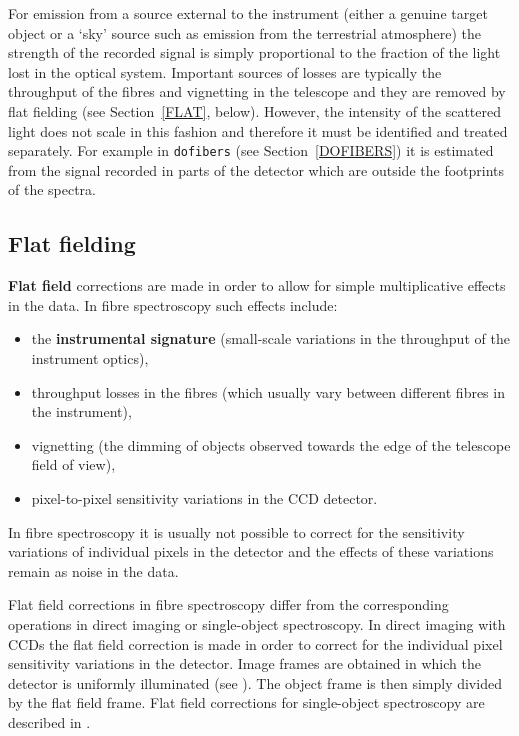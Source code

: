\documentclass[twoside,11pt]{starlink}
\begin{document}
For emission from a source external to the instrument (either a
genuine target object or a `sky' source such as emission from the
terrestrial atmosphere) the strength of the recorded signal is simply
proportional to the fraction of the light lost in the optical system.
Important sources of losses are typically the throughput of the fibres
and vignetting in the telescope and they are removed by flat fielding
(see Section~\ref{FLAT}, below).  However, the intensity of the scattered
light does not scale in this fashion and therefore it must be identified
and treated separately.  For example in \texttt{dofibers} (see
Section~\ref{DOFIBERS}) it is estimated from the signal recorded in parts
of the detector which are outside the footprints of the spectra.

\subsection{\label{FLAT}Flat fielding}

\textbf{Flat field} corrections are made in order to allow for simple
multiplicative effects in the data.  In fibre spectroscopy such effects
include:

\begin{itemize}

  \item the \textbf{instrumental signature} (small-scale variations in the
   throughput of the instrument optics),

  \item throughput losses in the fibres (which usually vary between
   different fibres in the instrument),

  \item vignetting (the dimming of objects observed towards the edge of
   the telescope field of view),

  \item pixel-to-pixel sensitivity variations in the CCD detector.

\end{itemize}

In fibre spectroscopy it is usually not possible to correct for the
sensitivity variations of individual pixels in the detector and the
effects of these variations remain as noise in the data.

Flat field corrections in fibre spectroscopy differ from the corresponding
operations in direct imaging or single-object spectroscopy.  In direct
imaging with CCDs the flat field correction is made in order to correct
for the individual pixel sensitivity variations in the detector.  Image
frames are obtained in which the detector is uniformly illuminated
(see ).  The object frame is then simply divided by
the flat field frame.  Flat field corrections for single-object
spectroscopy are described in .
\end{document}

